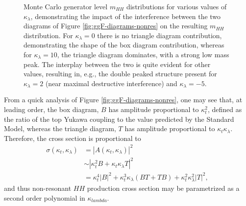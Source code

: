 \begin{figure}[ht]
\centering
{}
\caption{\label{fig:kl-shapes} Monte Carlo generator level $m_{HH}$ distributions for various values of 
$\kappa_{\lambda}$, demonstrating the impact of the interference between the two diagrams of Figure \ref{fig:ggF-diagrams-nonres} 
on the resulting $m_{HH}$ distribution. For $\kappa_{\lambda} = 0$ there is no triangle diagram contribution, 
demonstrating the shape of the box diagram contribution, whereas for $\kappa_{\lambda}=10$, the triangle diagram 
dominates, with a strong low mass peak. The interplay between the two is quite evident for other values, resulting in, 
e.g., the double peaked structure present for $\kappa_{\lambda} = 2$ (near maximal destructive interference) and $\kappa_{\lambda}=-5$. ~\cite{HDBS-2018-58}}
\end{figure}

From a quick analysis of Figure \ref{fig:ggF-diagrams-nonres}, one may see that, at leading order, the box diagram, $B$ 
has amplitude proportional to $\kappa_{t}^2$, defined as the ratio of the top Yukawa coupling to the value 
predicted by the Standard Model, whereas the triangle diagram, $T$ has amplitude proportional to 
$\kappa_{t}\kappa_{\lambda}$. Therefore, the cross section is proportional to 
\begin{align}
\sigma(\kappa_{t}, \kappa_{\lambda}) &= |A(\kappa_{t}, \kappa_{\lambda})|^2 \\
&\sim |\kappa_{t}^2B +\kappa_{t}\kappa_{\lambda}T|^2\\
&= \kappa_{t}^4|B|^2 + \kappa_{t}^3\kappa_{\lambda}(BT+TB) + \kappa_{t}^2\kappa_{\lambda}^2|T|^2,
\end{align} 
and thus non-resonant $HH$ production cross section may be parametrized as a second order 
polynomial in $\kappa_{lambda}$.

